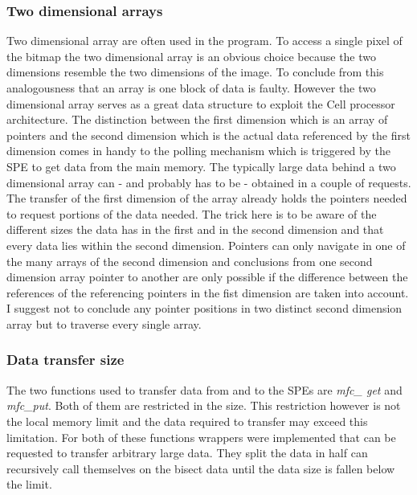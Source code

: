 \subsubsection{Two dimensional arrays}
Two dimensional array are often used in the program. To access a single pixel of the bitmap the two dimensional array is an obvious choice because the two dimensions resemble the two dimensions of the image. To conclude from this analogousness that an array is one block of data is faulty.
However the two dimensional array serves as a great data structure to exploit the Cell processor architecture. The distinction between the first dimension which is an array of pointers and the second dimension which is the actual data referenced by the first dimension comes in handy to the polling mechanism which is triggered by the SPE to get data from the main memory. The typically large data behind a two dimensional array can - and probably has to be - obtained in a couple of requests. The transfer of the first dimension of the array already holds the pointers needed to request portions of the data needed.
The trick here is to be aware of the different sizes the data has in the first and in the second dimension and that every data lies within the second dimension. Pointers can only navigate in one of the many arrays of the second dimension and conclusions from one second dimension array pointer to another are only possible if the difference between the references of the referencing pointers in the fist dimension are taken into account. I suggest not to conclude any pointer positions in two distinct second dimension array but to traverse every single array. 

\subsubsection{Data transfer size}
The two functions used to transfer data from and to the SPEs are \emph{mfc\_ get} and \emph{mfc\_put}. Both of them are restricted in the size. This restriction however is not the local memory limit and the data required to transfer may exceed this limitation. For both of these functions wrappers were implemented that can be requested to transfer arbitrary large data. They split the data in half can recursively call themselves on the bisect data until the data size is fallen below the limit.


